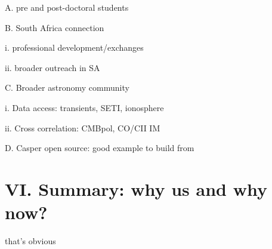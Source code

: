 \documentclass[preprint]{aastex}
\begin{document}
A. pre and post-doctoral students

B. South Africa connection

i. professional development/exchanges

ii. broader outreach in SA

C. Broader astronomy community

i. Data access: transients, SETI, ionosphere

ii. Cross correlation: CMBpol, CO/CII IM

D. Casper open source: good example to build from


\section{VI. Summary: why us and why now?} %

that's obvious


\clearpage
\setcounter{page}{1}
\thispagestyle{empty}
%
%


\end{document}
